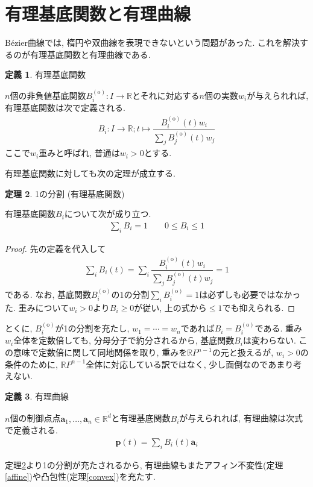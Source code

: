 \documentclass{jsarticle}
\newcommand\setR{\mathbb{R}}
\theoremstyle{definition}%
\newtheorem{thm}{定理}
\newtheorem{defn}[thm]{定義}
\begin{document}
\clearpage
\section{有理基底関数と有理曲線}
B\'ezier曲線では, 楕円や双曲線を表現できないという問題があった.
これを解決するのが有理基底関数と有理曲線である.
\begin{screen}
	\begin{defn}
		有理基底関数

		$n$個の非負値基底関数$B_i^{(\text{o})}:I\to \setR$とそれに対応する$n$個の実数$w_i$が与えられれば, 有理基底関数は次で定義される.
		\begin{align}
			B_i:I\to \setR;t\mapsto \dfrac{B_{i}^{(\text{o})}(t)w_i}{\sum\limits_{j}B_{j}^{(\text{o})}(t)w_j}
		\end{align}
		ここで$w_i$重みと呼ばれ, 普通は$w_i>0$とする.
	\end{defn}
\end{screen}
有理基底関数に対しても次の定理が成立する.
\begin{screen}
	\begin{thm}
		\label{Thm201}
		1の分割 (有理基底関数)

        有理基底関数$B_i$について次が成り立つ.
		\begin{align}
			\sum_i B_i= 1 \qquad
            0\le B_i\le 1
		\end{align}
	\end{thm}
\end{screen}
\begin{proof}
	先の定義を代入して
	\begin{align}
		\sum_i B_i(t)=\sum_i \dfrac{B_{i}^{(\text{o})}(t)w_i}{\sum\limits_{j}B_{j}^{(\text{o})}(t)w_j}= 1
	\end{align}
	である.
	なお, 基底関数$B_i^{(\text{o})}$の$1$の分割$\sum\limits_iB_i^{(\text{o})}= 1$は必ずしも必要ではなかった.
    重みについて$w_i>0$より$B_i\ge 0$が従い, 上の式から$\le 1$でも抑えられる.
\end{proof}
とくに, $B_i^{(\text{o})}$が1の分割を充たし, $w_1=\cdots=w_n$であれば$B_i=B_i^{(\text{o})}$である.
重み$w_i$全体を定数倍しても, 分母分子で約分されるから, 基底関数$B_i$は変わらない.
この意味で定数倍に関して同地関係を取り, 重みを$\setR P^{n-1}$の元と扱えるが, $w_i>0$の条件のために, $\setR P^{n-1}$全体に対応している訳ではなく, 少し面倒なのであまり考えない.
\begin{screen}
	\begin{defn}
		有理曲線

        $n$個の制御点点$\bm{a}_1, \dots, \bm{a}_n\in\mathbb{R}^{\tilde{d}}$と有理基底関数$B_i$が与えられれば, 有理曲線は次式で定義される.
		\begin{align}
			\bm{p}(t)=\sum_i B_i(t) \bm{a}_i
		\end{align}
	\end{defn}
\end{screen}
定理\ref{Thm201}より1の分割が充たされるから, 有理曲線もまたアフィン不変性(定理\ref{affine})や凸包性(定理\ref{convex})を充たす.
\end{document}
